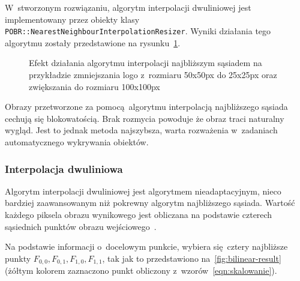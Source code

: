 W~stworzonym rozwiązaniu, algorytm interpolacji dwuliniowej jest implementowany przez  obiekty klasy \texttt{POBR::NearestNeighbourInterpolationResizer}. Wyniki działania tego algorytmu zostały przedstawione na rysunku~\ref{fig:nearestneighbour-result}. 

\begin{figure}[h]
    \centering
    \qquad
    \qquad
    \caption{Efekt działania algorytmu interpolacji najbliższym sąsiadem na przykładzie zmniejszania logo \bk z~rozmiaru 50x50px do 25x25px oraz zwiększania do rozmiaru 100x100px}
    \label{fig:nearestneighbour-result}
\end{figure}

Obrazy przetworzone za pomocą algorytmu interpolacją najbliższego sąsiada cechują się blokowatością. Brak rozmycia powoduje że obraz traci naturalny wygląd. Jest to jednak metoda najszybsza, warta rozważenia w~zadaniach automatycznego wykrywania obiektów.

\subsubsection{Interpolacja dwuliniowa}
Algorytm interpolacji dwuliniowej jest algorytmem nieadaptacyjnym, nieco bardziej zaawansowanym niż pokrewny algorytm najbliższego sąsiada. Wartość każdego piksela obrazu wynikowego jest obliczana na podstawie czterech sąsiednich punktów obrazu wejściowego~\cite{algorytmy:bilinear}.

Na podstawie informacji o~docelowym punkcie, wybiera się cztery najbliższe punkty $F_{0,0}, F_{0,1}, F_{1,0}, F_{1,1}$, tak jak to przedstawiono na~\ref{fig:bilinear-result} (żółtym kolorem zaznaczono punkt obliczony z~wzorów~\ref{eqn:skalowanie}). 


